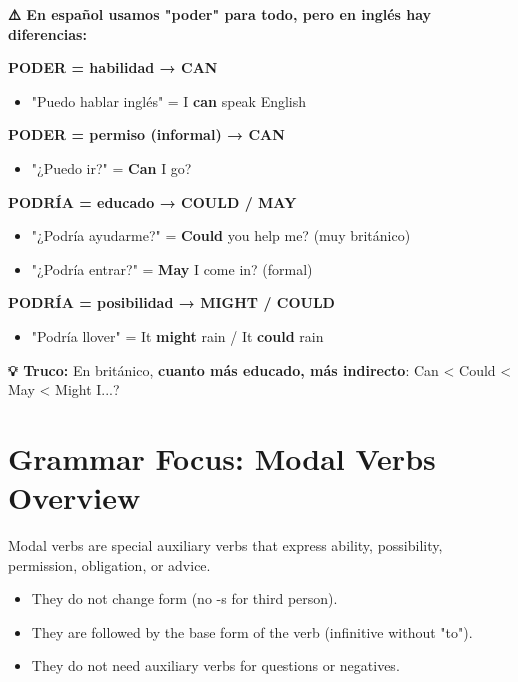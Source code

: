 \begin{comparisonbox}[title=🇪🇸 "Poder" en Español vs CAN/COULD/MAY en Inglés]
\textbf{⚠️ En español usamos "poder" para todo, pero en inglés hay diferencias:}

\textbf{PODER = habilidad → CAN}
\begin{itemize}
    \item "Puedo hablar inglés" = I \textbf{can} speak English
\end{itemize}

\textbf{PODER = permiso (informal) → CAN}
\begin{itemize}
    \item "¿Puedo ir?" = \textbf{Can} I go?
\end{itemize}

\textbf{PODRÍA = educado → COULD / MAY}
\begin{itemize}
    \item "¿Podría ayudarme?" = \textbf{Could} you help me? (muy británico)
    \item "¿Podría entrar?" = \textbf{May} I come in? (formal)
\end{itemize}

\textbf{PODRÍA = posibilidad → MIGHT / COULD}
\begin{itemize}
    \item "Podría llover" = It \textbf{might} rain / It \textbf{could} rain
\end{itemize}

\textbf{💡 Truco:} En británico, \textbf{cuanto más educado, más indirecto}: Can < Could < May < Might I...?
\end{comparisonbox}

\section{Grammar Focus: Modal Verbs Overview}

Modal verbs are special auxiliary verbs that express ability, possibility, permission, obligation, or advice.

\begin{grammarbox}[title=General Rules]
\begin{itemize}
    \item They do not change form (no -s for third person).
    \item They are followed by the base form of the verb (infinitive without "to").
    \item They do not need auxiliary verbs for questions or negatives.
\end{itemize}
\end{grammarbox}

